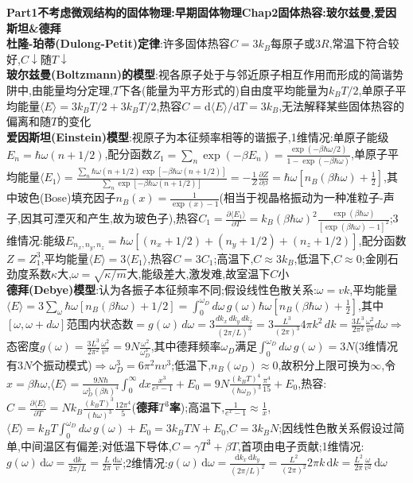 \documentclass[UTF8,10pt,a4paper]{article}
\begin{document}
\tiny
\begin{multicols}{2}
\noindent\textbf{Part1不考虑微观结构的固体物理:早期固体物理Chap2固体热容:玻尔兹曼,爱因斯坦\&德拜}\\
\textbf{杜隆-珀蒂(Dulong-Petit)定律}:许多固体热容$C=3k_B\text{每原子或}3R$,常温下符合较好,$C\downarrow$随$T\downarrow$\\
\textbf{玻尔兹曼(Boltzmann)的模型}:视各原子处于与邻近原子相互作用而形成的简谐势阱中,由能量均分定理,$T$下各(能量为平方形式的)自由度平均能量为$k_BT/2$,单原子平均能量$\langle E\rangle=3k_BT/2+3k_BT/2$,热容$C=\mathrm{d}\langle E\rangle/\mathrm{d}T=3k_B$,无法解释某些固体热容的偏离和随$T$的变化\\
\textbf{爱因斯坦(Einstein)模型}:视原子为本征频率相等的谐振子,1维情况:单原子能级$E_n=\hbar\omega(n+1/2)$,配分函数$Z_1=\sum_n\exp(-\beta E_n)=\frac{\exp(-\beta\hbar\omega/2)}{1-\exp(-\beta\hbar\omega)}$,单原子平均能量$\langle E_1\rangle=\frac{\sum_n\hbar\omega(n+1/2)\exp[-\beta\hbar\omega(n+1/2)]}{\sum_n\exp[-\beta\hbar\omega(n+1/2)]}=-\frac{1}{Z}\frac{\partial Z}{\partial\beta}=\hbar\omega[n_B(\beta\hbar\omega)+\frac{1}{2}]$,其中玻色(Bose)填充因子$n_B(x)=\frac{1}{\exp(x)-1}$(相当于视晶格振动为一种准粒子-声子,因其可湮灭和产生,故为玻色子),热容$C_1=\frac{\partial\langle E_1\rangle}{\partial T}=k_B(\beta\hbar\omega)^2\frac{\exp(\beta\hbar\omega)}{[\exp(\beta\hbar\omega)-1]^2}$;3维情况:能级$E_{n_x,n_y,n_z}=\hbar\omega[(n_x+1/2)+(n_y+1/2)+(n_z+1/2)]$,配分函数$Z=Z_1^3$,平均能量$\langle E\rangle=3\langle E_1\rangle$,热容$C=3C_1$;高温下,$C\approx 3k_B$,低温下,$C\approx 0$;金刚石劲度系数$\kappa$大,$\omega=\sqrt{\kappa/m}$大,能级差大,激发难,故室温下$C$小\\
\textbf{德拜(Debye)模型}:认为各振子本征频率不同;假设线性色散关系:$\omega=vk$,平均能量$\langle E\rangle=3\sum_{\omega}\hbar\omega[n_B(\beta\hbar\omega)+1/2]=\int_0^{\omega_D}d\omega\,g(\omega)\hbar\omega[n_B(\beta\hbar\omega)+\frac{1}{2}]$,其中$[\omega,\omega+d\omega]$范围内状态数$=g(\omega)\,d\omega=3\frac{dk_x\,dk_y\,dk_z}{(2\pi/L)^3}=3\frac{L^3}{(2\pi)^3}4\pi k^2\,dk=\frac{3L^3}{2\pi^2}\frac{\omega^2}{v^3}d\omega\Rightarrow$态密度$g(\omega)=\frac{3L^3}{2\pi^2}\frac{\omega^2}{v^3}=9N\frac{\omega^2}{\omega_D^3}$,其中德拜频率$\omega_D$满足$\int_0^{\omega_D}d\omega\,g(\omega)=3N$($3$维情况有$3N$个振动模式)$\Rightarrow\omega_D^3=6\pi^2nv^3$;低温下,$n_B(\omega_D)\approx 0$,故积分上限可换为$\infty$,令$x=\beta\hbar\omega$,$\langle E\rangle=\frac{9N\hbar}{\omega_D^3(\beta\hbar)^4}\int_0^{\infty}dx\frac{x^3}{e^x-1}+E_0=9N\frac{(k_BT)^4}{(\hbar\omega_D)^3}\frac{\pi^4}{15}+E_0$,热容:$C=\frac{\partial\langle E\rangle}{\partial T}=Nk_B\frac{(k_BT)^3}{(\hbar\omega)^3}\frac{12\pi^4}{5}$(\textbf{德拜$T^3$率});高温下,$\frac{1}{e^x-1}\approx\frac{1}{x}$,$\langle E\rangle=k_BT\int_0^{\omega_D}d\omega\,g(\omega)+E_0=3k_BTN+E_0$,$C=3k_BN$;因线性色散关系假设过简单,中间温区有偏差;对低温下导体,$C=\gamma T^3+\beta T$,首项由电子贡献;1维情况:$g(\omega)\,\mathrm{d}\omega=\frac{\mathrm{d}k}{2\pi/L}=\frac{L}{2\pi}\frac{\mathrm{d}\omega}{v}$;2维情况:$g(\omega)\,\mathrm{d}\omega=\frac{\mathrm{d}k_x\,\mathrm{d}k_y}{(2\pi/L)^2}=\frac{L^2}{(2\pi)^2}2\pi k\,\mathrm{d}k=\frac{L^2}{2\pi}\frac{\omega}{v^2}\,\mathrm{d}\omega$\\%

\end{multicols}
\end{document}
